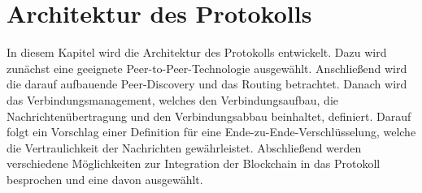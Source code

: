\chapter{Architektur des Protokolls}
\label{chap:entwurf_und_architektur}

In diesem Kapitel wird die Architektur des Protokolls entwickelt. Dazu wird zunächst eine geeignete Peer-to-Peer-Technologie ausgewählt. Anschließend wird die darauf aufbauende Peer-Discovery und das Routing betrachtet. Danach wird das Verbindungsmanagement, welches den Verbindungsaufbau, die Nachrichtenübertragung und den Verbindungsabbau beinhaltet, definiert. Darauf folgt ein Vorschlag einer Definition für eine Ende-zu-Ende-Verschlüsselung, welche die Vertraulichkeit der Nachrichten gewährleistet. Abschließend werden verschiedene Möglichkeiten zur Integration der Blockchain in das Protokoll besprochen und eine davon ausgewählt.













